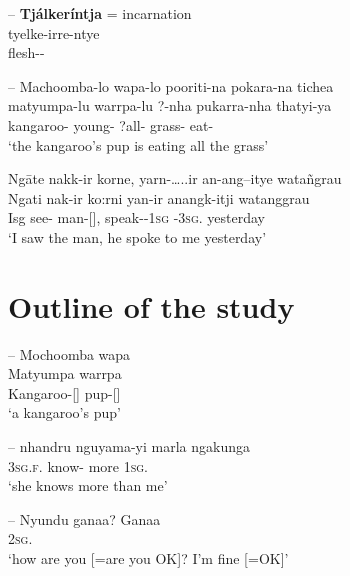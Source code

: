 \documentclass{langscibook}
\begin{document}
--
\ea
\textbf{Tjálkeríntja} = incarnation \\
\gll tyelke-irre-ntye \\
flesh-- \\
\glt \citep[62]{strehlow_aranda_1944}
\z





--
\ea
\glll Machoomba-lo wapa-lo pooriti-na pokara-na tichea \\
matyumpa-lu warrpa-lu ?-nha pukarra-nha thatyi-ya \\
kangaroo- young- ?all- grass- eat-\\
\glt `the kangaroo’s pup is eating all the grass' \\
\citep[12]{roth_ethnological_1897}
\z



\ea
\glll Ngāte nakk-ir korne, yarn-…..ir an-ang–itye watañgrau \\
Ngati nak-ir ko:rni yan-ir anangk-itji watanggrau \\
Isg see- man-[], speak--1\textsc{sg} -3\textsc{sg}. yesterday \\
\glt `I saw the man, he spoke to me yesterday' \\
\citep[33]{meyer_vocabulary_1843}
\z



\section{Outline of the study}
--
\ea
\glll Mochoomba wapa \\
Matyumpa warrpa\\
Kangaroo-[] pup-[]\\
\glt `a kangaroo’s pup'  \\
\citep[8]{roth_ethnological_1897}
\z


--
\ea
\gll nhandru nguyama-yi marla ngakunga \\
3\textsc{sg}.\textsc{f}. know- more 1\textsc{sg}.\\
\glt `she knows more than me' \\
\citep[112]{austin_grammar_2013}
\z





--
\ea
\gll Nyundu ganaa? Ganaa \\
2\textsc{sg}.  \\
\glt `how are you [=are you OK]? I’m fine [=OK]' \\
\citep[152]{haviland_guugu_1979} 
\z
\end{document}
